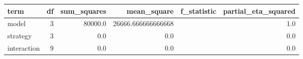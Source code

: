 \begin{tabular}{lrrrrr}
\toprule
term & df & sum_squares & mean_square & f_statistic & partial_eta_squared \\
\midrule
model & 3 & 80000.0 & 26666.666666666668 &  & 1.0 \\
strategy & 3 & 0.0 & 0.0 &  & 0.0 \\
interaction & 9 & 0.0 & 0.0 &  & 0.0 \\
\bottomrule
\end{tabular}
